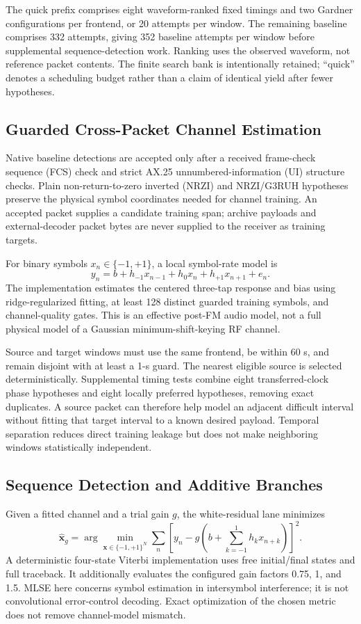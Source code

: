 \documentclass{ieeeaccess}
\begin{document}
The quick prefix comprises eight waveform-ranked fixed timings and two Gardner configurations per frontend, or 20 attempts per window. The remaining baseline comprises 332 attempts, giving 352 baseline attempts per window before supplemental sequence-detection work. Ranking uses the observed waveform, not reference packet contents. The finite search bank is intentionally retained; ``quick'' denotes a scheduling budget rather than a claim of identical yield after fewer hypotheses.

\subsection{Guarded Cross-Packet Channel Estimation}
Native baseline detections are accepted only after a received frame-check sequence (FCS) check and strict AX.25 unnumbered-information (UI) structure checks. Plain non-return-to-zero inverted (NRZI) and NRZI/G3RUH hypotheses preserve the physical symbol coordinates needed for channel training. An accepted packet supplies a candidate training span; archive payloads and external-decoder packet bytes are never supplied to the receiver as training targets.

For binary symbols $x_n\in\{-1,+1\}$, a local symbol-rate model is
\begin{equation}
y_n=b+h_{-1}x_{n-1}+h_0x_n+h_{+1}x_{n+1}+e_n.
\label{eq:channel}
\end{equation}
The implementation estimates the centered three-tap response and bias using ridge-regularized fitting, at least 128 distinct guarded training symbols, and channel-quality gates. This is an effective post-FM audio model, not a full physical model of a Gaussian minimum-shift-keying RF channel.

Source and target windows must use the same frontend, be within 60 s, and remain disjoint with at least a 1-s guard. The nearest eligible source is selected deterministically. Supplemental timing tests combine eight transferred-clock phase hypotheses and eight locally preferred hypotheses, removing exact duplicates. A source packet can therefore help model an adjacent difficult interval without fitting that target interval to a known desired payload. Temporal separation reduces direct training leakage but does not make neighboring windows statistically independent.

\subsection{Sequence Detection and Additive Branches}
Given a fitted channel and a trial gain $g$, the white-residual lane minimizes
\begin{equation}
\widehat{\boldsymbol{x}}_g=\arg\min_{\boldsymbol{x}\in\{-1,+1\}^N}
\sum_n\left[y_n-g\left(b+\sum_{k=-1}^{1}h_k x_{n+k}\right)\right]^2.
\label{eq:mlse}
\end{equation}
A deterministic four-state Viterbi implementation uses free initial/final states and full traceback. It additionally evaluates the configured gain factors 0.75, 1, and 1.5. MLSE here concerns symbol estimation in intersymbol interference; it is not convolutional error-control decoding. Exact optimization of the chosen metric does not remove channel-model mismatch.
\end{document}
